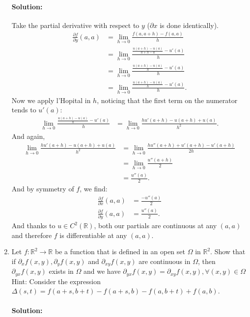 \documentclass{article}
\begin{document}
\begin{enumerate}
    \paragraph{Solution: }Take the partial derivative with respect to $y$ ($\partial x$ is done identically).
    \begin{align*}
        \frac{\partial f}{\partial y}(a,a) &= \lim_{h \to 0} \frac{f(a,a+h)-f(a,a)  }{h} \\
        &= \lim_{h \to 0} \frac{ \frac{u(a+h)-u(a)}{a+h-a}-u'(a)}{h} \\
        &= \lim_{h \to 0} \frac{ \frac{u(a+h)-u(a)}{h}-u'(a)}{h} \\
        &= \lim_{h \to 0} \frac{ \frac{u(a+h)-u(a)}{h}-u'(a)}{h}
    .\end{align*}
    Now we apply l'Hopital in $h$, noticing that the first term on the numerator tends to $u'(a)$:
    \begin{align*}
        \lim_{h \to 0} \frac{ \frac{u(a+h)-u(a)}{h}-u'(a)}{h}
        &=\lim_{h \to 0} \frac{hu'(a+h)-u(a+h)+u(a)}{h^2}
    .\end{align*}
    And again,
    \begin{align*}
        \lim_{h \to 0} \frac{hu'(a+h)-u(a+h)+u(a)}{h^2}&=\lim_{h \to 0} \frac{hu''(a+h)+u'(a+h)-u'(a+h)}{2h}\\
        &= \lim_{h \to 0}  \frac{u''(a+h)}{2} \\
        &= \frac{u''(a)}{2}
    .\end{align*}
    And by symmetry of $f$, we find:
    \begin{align*}
        \frac{\partial f}{\partial x}(a,a) &= \frac{-u''(a)}{2}\\
        \frac{\partial f}{\partial y}(a,a) &= \frac{u''(a)}{2}
    .\end{align*}
    And thanks to $u\in C^2(\mathbb{R})$, both our partials are continuous at any $(a,a)$ and therefore $f$ is differentiable at any $(a,a)$.
    

\newpage
\item Let $f : \mathbb{R}^2 \to \mathbb{R}$ be a function that is defined in an open set $\Omega$ in $\mathbb{R}^2$.  Show that if $\partial_x f(x,y), \partial_y f(x,y)$ and $\partial_{xy} f(x,y)$ are continuous in $\Omega$, then $\partial_{yx} f(x,y)$ exists in $\Omega$ and we have  $\partial_{yx} f(x,y) = \partial_{xy} f(x,y), \forall (x,y) \in \Omega$  Hint: Consider the expression $\Delta(s,t) = f(a+s,b+t) - f(a+s,b) - f(a,b+t) + f(a,b)$.  
    \paragraph{Solution: } %


\end{enumerate}
\end{document}
